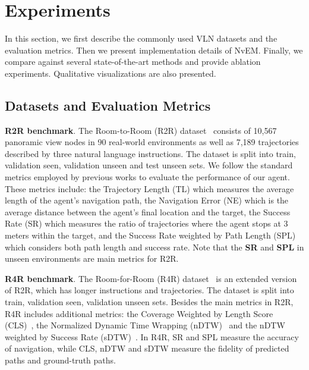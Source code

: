 \documentclass[sigconf]{acmart}
\begin{document}
\section{Experiments}
In this section, we first describe the commonly used VLN datasets and the evaluation metrics. 
Then we present implementation details of NvEM.
Finally, we compare against several state-of-the-art methods and provide ablation experiments. Qualitative visualizations are also presented.

\subsection{Datasets and Evaluation Metrics}
\noindent\textbf{R2R benchmark}. The Room-to-Room (R2R) dataset~\cite{anderson2018vln} consists of 10,567 panoramic view nodes in 90 real-world environments as well as 7,189 trajectories described by three natural language instructions. 
The dataset is split into train, validation seen, validation unseen and test unseen sets. We follow the standard metrics employed by previous works to evaluate the performance of our agent. These metrics include: the Trajectory Length (TL) which measures the average length of the agent's navigation path, the Navigation Error (NE) which is the average distance between the agent's final location and the target, the Success Rate (SR) which measures the ratio of trajectories where the agent stops at 3 meters within the target, and the Success Rate weighted by Path Length (SPL) which considers both path length and success rate. Note that the \textbf{SR} and \textbf{SPL} in unseen environments are main metrics for R2R.

\noindent\textbf{R4R benchmark}. The Room-for-Room (R4R) dataset~\cite{jain2019r4r} is an extended version of R2R, which has longer instructions and trajectories. 
The dataset is split into train, validation seen, validation unseen sets. 
Besides the main metrics in R2R, R4R includes additional metrics: the Coverage Weighted by Length Score (CLS)~\cite{jain2019r4r}, the Normalized Dynamic Time Wrapping (nDTW)~\cite{grabriel2019general} and the nDTW weighted by Success Rate (sDTW)~\cite{grabriel2019general}. In R4R, {SR} and {SPL} measure the accuracy of navigation, while {CLS}, {nDTW} and {sDTW} measure the fidelity of predicted paths and ground-truth paths.
\end{document}
